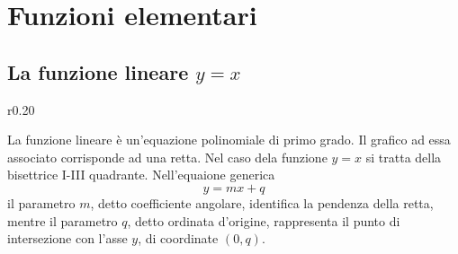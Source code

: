 \documentclass{article}     %
\begin{document}
    \section{Funzioni elementari}
    \subsection{La funzione lineare $y=x$}
        \begin{wrapfigure}[8]{r}{0.20\textwidth}
            \begin{center}
            \end{center}
        \end{wrapfigure}
        La funzione lineare è un'equazione polinomiale di primo grado. Il grafico ad essa associato corrisponde ad una retta. Nel caso dela funzione $y=x$ si tratta della bisettrice I-III quadrante. Nell'equaione generica \[y=mx+q\] il parametro $m$, detto coefficiente angolare, identifica la pendenza della retta, mentre il parametro $q$, detto ordinata d'origine, rappresenta il punto di intersezione con l'asse $y$, di coordinate $(0,q)$.
\end{document}
